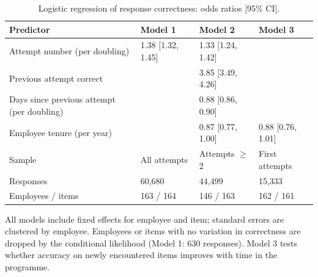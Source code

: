 \begin{table}[htbp]
\centering
\caption{Logistic regression of response correctness: odds ratios [95\% CI].}
\label{tab:regression}
\small
\setlength{\tabcolsep}{3.5pt}
\begin{tabular}{llll}
\toprule
Predictor & Model 1 & Model 2 & Model 3 \\
\midrule
Attempt number (per doubling) & 1.38 [1.32, 1.45] & 1.33 [1.24, 1.42] &  \\
Previous attempt correct &  & 3.85 [3.49, 4.26] &  \\
Days since previous attempt (per doubling) &  & 0.88 [0.86, 0.90] &  \\
Employee tenure (per year) &  & 0.87 [0.77, 1.00] & 0.88 [0.76, 1.01] \\
\midrule
Sample & All attempts & Attempts $\geq$2 & First attempts \\
Responses & 60,680 & 44,499 & 15,333 \\
Employees / items & 163 / 164 & 146 / 163 & 162 / 161 \\
\bottomrule
\end{tabular}

\vspace{2pt}
\parbox{\linewidth}{\footnotesize All models include fixed effects for employee and item; standard errors are clustered by employee. Employees or items with no variation in correctness are dropped by the conditional likelihood (Model 1: 630 responses). Model 3 tests whether accuracy on newly encountered items improves with time in the programme.}
\end{table}
